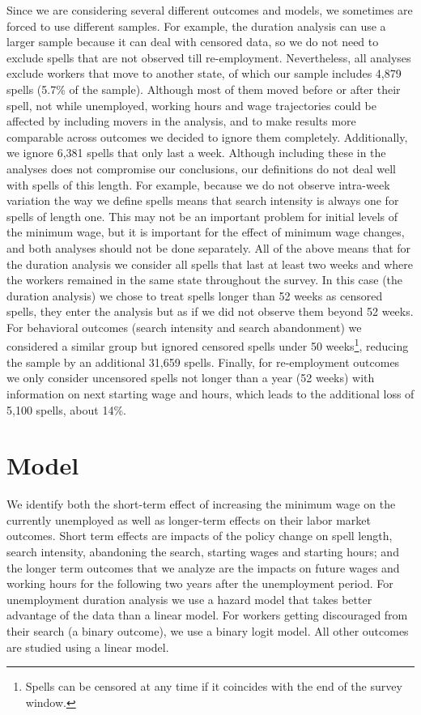 \documentclass{article}
\begin{document}
Since we are considering several different outcomes and models, we sometimes are forced to use different samples. For example, the duration analysis can use a larger sample because it can deal with censored data, so we do not need to exclude spells that are not observed till re-employment. Nevertheless, all analyses exclude workers that move to another state, of which our sample includes 4,879 spells (5.7\% of the sample). Although most of them moved before or after their spell, not while unemployed, working hours and wage trajectories could be affected by including movers in the analysis, and to make results more comparable across outcomes we decided to ignore them completely. Additionally, we ignore 6,381 spells that only last a week. Although including these in the analyses does not compromise our conclusions, our definitions do not deal well with spells of this length. For example, because we do not observe intra-week variation the way we define spells means that search intensity is always one for spells of length one. This may not be an important problem for initial levels of the minimum wage, but it is important for the effect of minimum wage changes, and both analyses should not be done separately. All of the above means that for the duration analysis we consider all spells that last at least two weeks and where the workers remained in the same state throughout the survey. In this case (the duration analysis) we chose to treat spells longer than 52 weeks as censored spells, they enter the analysis but as if we did not observe them beyond 52 weeks. For behavioral outcomes (search intensity and search abandonment) we considered a similar group but ignored censored spells under 50 weeks\footnote{Spells can be censored at any time if it coincides with the end of the survey window.}, reducing the sample by an additional 31,659 spells. Finally, for re-employment outcomes we only consider uncensored spells not longer than a year (52 weeks) with information on next starting wage and hours, which leads to the additional loss of 5,100 spells, about 14\%.

\section{Model}

We identify both the short-term effect of increasing the minimum wage on the currently unemployed as well as longer-term effects on their labor market outcomes. Short term effects are impacts of the policy change on spell length, search intensity, abandoning the search, starting wages and starting hours; and the longer term outcomes that we analyze are the impacts on future wages and working hours for the following two years after the unemployment period. For unemployment duration analysis we use a hazard model that takes better advantage of the data than a linear model. For workers getting discouraged from their search (a binary outcome), we use a binary logit model.  All other outcomes are studied using a linear model.
\end{document}
